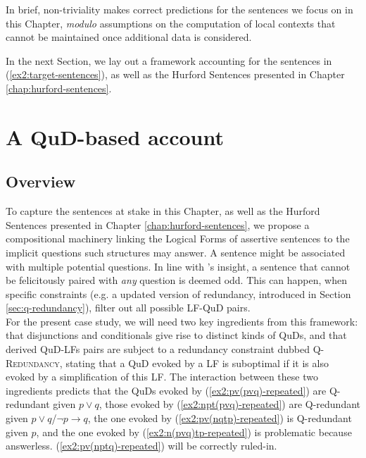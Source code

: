 In brief, non-triviality makes correct predictions for the sentences we focus on in this Chapter, \textit{modulo} assumptions on the computation of local contexts that cannot be maintained once additional data is considered.

 
In the next Section, we lay out a framework accounting for the sentences in (\ref{ex2:target-sentences}), as well as the Hurford Sentences presented in Chapter \ref{chap:hurford-sentences}.






\section{A QuD-based account}\label{sec:my-account}
\subsection{Overview}
To capture the sentences at stake in this Chapter, as well as the Hurford Sentences presented in Chapter \ref{chap:hurford-sentences}, we propose a compositional machinery linking the Logical Forms of assertive sentences to the implicit questions such structures may answer. A sentence might be associated with multiple potential questions. In line with \citet{Katzir2015}'s insight, a sentence that cannot be felicitously paired with \textit{any} question is deemed odd. This can happen, when specific constraints (e.g. a updated version of redundancy, introduced in Section \ref{sec:q-redundancy}), filter out all possible LF-QuD pairs.\\

For the present case study, we will need two key ingredients from this framework: that disjunctions and conditionals give rise to distinct kinds of QuDs, and that derived QuD-LFs pairs are subject to a redundancy constraint dubbed \textsc{Q-Redundancy}, stating that a QuD evoked by a LF is suboptimal if it is also evoked by a simplification of this LF. The interaction between these two ingredients predicts that the QuDs evoked by (\ref{ex2:pv(pvq)-repeated}) are Q-redundant given $p\vee q$, those evoked by
(\ref{ex2:npt(pvq)-repeated}) are Q-redundant given $p \vee q$/$\neg p \rightarrow q$, the one evoked by (\ref{ex2:pv(nqtp)-repeated}) is Q-redundant given $p$, and the one evoked by (\ref{ex2:n(pvq)tp-repeated}) is problematic because answerless. (\ref{ex2:pv(nptq)-repeated}) will be correctly ruled-in.\\


